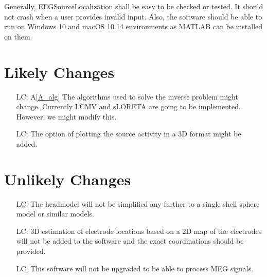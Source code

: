 \documentclass[12pt]{article}
\newcommand{\aref}[1]{A\ref{#1}}
\newcounter{lcnum} %
\renewcommand{\progname}{EEGSourceLocalization}
\begin{document}


Generally,  \progname{} shall be easy to be checked or tested. It should not crash when a user provides invalid input. Also, the software should  be able to run on Windows 10 and macOS 10.14 environments as MATLAB can be installed on them.\\


\section{Likely Changes}    

\noindent \begin{itemize}

\item[LC\refstepcounter{lcnum}\thelcnum\label{LC_alg}:] \aref{A_alg} The algorithms used to solve the inverse problem might change. Currently LCMV and sLORETA are going to be implemented. However, we might modify this.

\item[LC\refstepcounter{lcnum}\thelcnum\label{LC_HM}:] The option of plotting the source activity in a 3D format might be added.


\end{itemize}

\section{Unlikely Changes}    

\noindent \begin{itemize}

\item[LC\refstepcounter{lcnum}\thelcnum\label{LC_meaningfulLabel}:] The headmodel will not be simplified any further to a single shell sphere model or similar models.

\item[LC\refstepcounter{lcnum}\thelcnum\label{LC_meaningfulLabel}:] 3D estimation of electrode locations based on a 2D map of the electrodes will not be added to the software and the exact coordinations should be provided.

\item[LC\refstepcounter{lcnum}\thelcnum\label{LC_meaningfulLabel}:] This software will not be upgraded to be able to process MEG signals.


\end{itemize}
\end{document}
